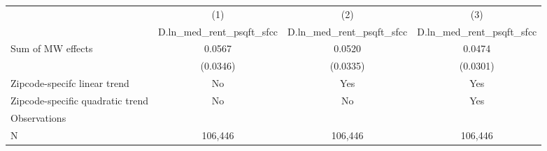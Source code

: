{
\def\sym#1{\ifmmode^{#1}\else\(^{#1}\)\fi}
\begin{tabular}{l*{3}{c}}
\hline\hline
          &\multicolumn{1}{c}{(1)}&\multicolumn{1}{c}{(2)}&\multicolumn{1}{c}{(3)}\\
          &\multicolumn{1}{c}{D.ln\_med\_rent\_psqft\_sfcc}&\multicolumn{1}{c}{D.ln\_med\_rent\_psqft\_sfcc}&\multicolumn{1}{c}{D.ln\_med\_rent\_psqft\_sfcc}\\
\hline
Sum of MW effects&   0.0567         &   0.0520         &   0.0474         \\
          & (0.0346)         & (0.0335)         & (0.0301)         \\
\hline
Zipcode-specifc linear trend&       No         &      Yes         &      Yes         \\
Zipcode-specific quadratic trend&       No         &       No         &      Yes         \\
Observations&                  &                  &                  \\
N         &  106,446         &  106,446         &  106,446         \\
\hline\hline
\end{tabular}
}
